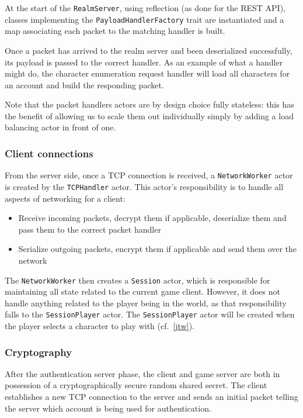 \documentclass[paper=a4, fontsize=11pt]{scrartcl}
\begin{document}
At the start of the \texttt{RealmServer}, using reflection (as done for the REST API),
classes implementing the \texttt{PayloadHandlerFactory} trait are instantiated
and a map associating each packet to the matching handler is built.

Once a packet has arrived to the realm server and been deserialized
successfully, its payload is passed to the correct handler.
As an example of what a handler might do, the character enumeration request
handler will load all characters for an account and build the responding packet.

Note that the packet handlers actors are by design choice fully stateless: this
has the benefit of allowing us to scale them out individually simply by adding a
load balancing actor in front of one.

\subsubsection{Client connections}

From the server side, once a TCP connection is received, a
\texttt{NetworkWorker} actor is created by the \texttt{TCPHandler} actor.
This actor's responsibility is to handle all aspects of networking for a client:
\begin{itemize}
    \item Receive incoming packets, decrypt them if applicable, deserialize them
        and pass them to the correct packet handler
    \item Serialize outgoing packets, encrypt them if applicable and send them
        over the network
\end{itemize}

The \texttt{NetworkWorker} then creates a \texttt{Session} actor, which is
responsible for maintaining all state related to the current game client.
However, it does not handle anything related to the player being in the world,
as that responsibility falls to the \texttt{SessionPlayer} actor.
The \texttt{SessionPlayer} actor will be created when the player selects a
character to play with (cf.~\ref{jtw}).

\subsubsection{Cryptography}

After the authentication server phase, the client and game server are both in
possession of a cryptographically secure random shared secret.
The client establishes a new TCP connection to the server and sends an initial
packet telling the server which account is being used for authentication.
\end{document}
